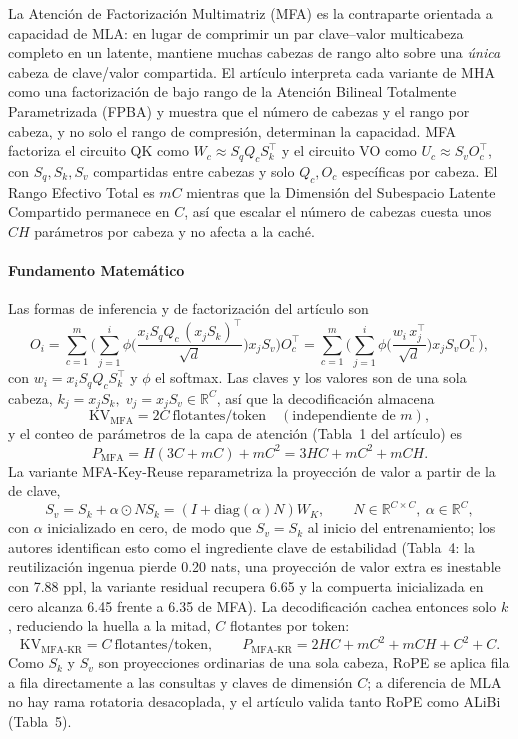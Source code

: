 La Atención de Factorización Multimatriz (MFA) \citep{hu_mfa_2025} es la contraparte orientada a capacidad de MLA: en lugar de comprimir un par clave--valor multicabeza completo en un latente, mantiene muchas cabezas de rango alto sobre una \emph{única} cabeza de clave/valor compartida. El artículo interpreta cada variante de MHA como una factorización de bajo rango de la Atención Bilineal Totalmente Parametrizada (FPBA) y muestra que el número de cabezas y el rango por cabeza, y no solo el rango de compresión, determinan la capacidad. MFA factoriza el circuito QK como $W_c\approx S_qQ_cS_k^{\top}$ y el circuito VO como $U_c\approx S_vO_c^{\top}$, con $S_q,S_k,S_v$ compartidas entre cabezas y solo $Q_c,O_c$ específicas por cabeza. El Rango Efectivo Total es $mC$ mientras que la Dimensión del Subespacio Latente Compartido permanece en $C$, así que escalar el número de cabezas cuesta unos $CH$ parámetros por cabeza y no afecta a la caché.

\paragraph{Fundamento Matemático}
Las formas de inferencia y de factorización del artículo son
\[
O_i=\sum_{c=1}^{m}\Big(\sum_{j=1}^{i}\phi\Big(\frac{x_iS_qQ_c\,(x_jS_k)^{\top}}{\sqrt{d}}\Big)x_jS_v\Big)O_c^{\top}
=\sum_{c=1}^{m}\Big(\sum_{j=1}^{i}\phi\Big(\frac{w_i\,x_j^{\top}}{\sqrt{d}}\Big)x_jS_vO_c^{\top}\Big),
\]
con $w_i=x_iS_qQ_cS_k^{\top}$ y $\phi$ el softmax. Las claves y los valores son de una sola cabeza, $k_j=x_jS_k,\;v_j=x_jS_v\in\mathbb{R}^{C}$, así que la decodificación almacena
\[
\mathrm{KV}_{\mathrm{MFA}}=2C\ \text{flotantes/token}\quad(\text{independiente de }m),
\]
y el conteo de parámetros de la capa de atención (Tabla~1 del artículo) es
\[
P_{\mathrm{MFA}}=H(3C+mC)+mC^{2}=3HC+mC^{2}+mCH .
\]
La variante MFA-Key-Reuse reparametriza la proyección de valor a partir de la de clave,
\[
S_v=S_k+\alpha\odot NS_k=(I+\mathrm{diag}(\alpha)N)W_K,\qquad N\in\mathbb{R}^{C\times C},\ \alpha\in\mathbb{R}^{C},
\]
con $\alpha$ inicializado en cero, de modo que $S_v=S_k$ al inicio del entrenamiento; los autores identifican esto como el ingrediente clave de estabilidad (Tabla~4: la reutilización ingenua pierde 0.20 nats, una proyección de valor extra es inestable con 7.88 ppl, la variante residual recupera 6.65 y la compuerta inicializada en cero alcanza 6.45 frente a 6.35 de MFA). La decodificación cachea entonces solo $k$, reduciendo la huella a la mitad, $C$ flotantes por token:
\[
\mathrm{KV}_{\mathrm{MFA\text{-}KR}}=C\ \text{flotantes/token},\qquad
P_{\mathrm{MFA\text{-}KR}}=2HC+mC^{2}+mCH+C^{2}+C .
\]
Como $S_k$ y $S_v$ son proyecciones ordinarias de una sola cabeza, RoPE se aplica fila a fila directamente a las consultas y claves de dimensión $C$; a diferencia de MLA no hay rama rotatoria desacoplada, y el artículo valida tanto RoPE como ALiBi (Tabla~5).

